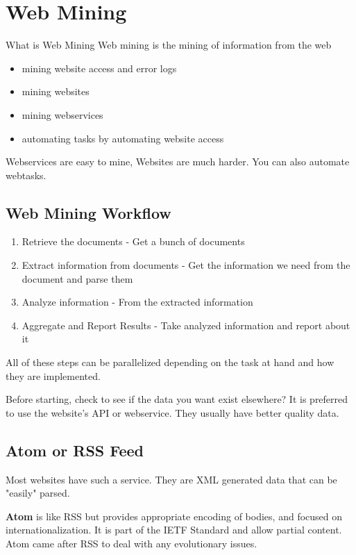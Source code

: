 \documentclass[../CMPUT-404-Notes.tex]{subfiles}
\begin{document}
\chapter{Web Mining}
\begin{Definition}{What is Web Mining}
    Web mining is the mining of information from the web
    \begin{itemize}
        \item mining website access and error logs
        \item mining websites
        \item mining webservices
        \item automating tasks by automating website access     
    \end{itemize}
\end{Definition}
Webservices are easy to mine, Websites are much harder. You can also automate webtasks.

\section{Web Mining Workflow}
\begin{enumerate}
    \item Retrieve the documents - Get a bunch of documents
    \item Extract information from documents - Get the information we need from the document and parse them
    \item Analyze information - From the extracted information
    \item Aggregate and Report Results - Take analyzed information and report about it
\end{enumerate}
All of these steps can be parallelized depending on the task at hand and how they are implemented.

Before starting, check to see if the data you want exist elsewhere? It is preferred to use the website's API or webservice. They usually have better quality data.

\section{Atom or RSS Feed}
Most websites have such a service. They are XML generated data that can be "easily" parsed. 

\textbf{Atom} is like RSS but provides appropriate encoding of bodies, and focused on internationalization. 
It is part of the IETF Standard and allow partial content. Atom came after RSS to deal with any evolutionary issues.
\end{document}
